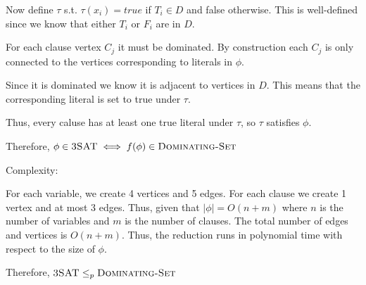 \documentclass[12pt, letterpaper]{article}
\begin{document}
\begin{problemproof}
    Now define $\tau$ s.t. $\tau(x_i)=true$ if $T_i \in D$ and false otherwise. This is well-defined since we know that either $T_i$ or $F_i$ are in $D$.

    For each clause vertex $C_j$ it must be dominated. By construction each $C_j$ is only connected to the vertices corresponding to literals in $\phi$.

    Since it is dominated we know it is adjacent to vertices in $D$. This means that the corresponding literal is set to true under $\tau$.

    Thus, every caluse has at least one true literal under $\tau$, so $\tau$ satisfies $\phi$.

    Therefore, $\phi \in \textsc{3SAT} \iff f(\phi) \in \textsc{Dominating-Set}$

    Complexity:

    For each variable, we create 4 vertices and 5 edges. For each clause we create 1 vertex and at most 3 edges. Thus, given that $|\phi|=O(n+m)$ where $n$ is the number of variables and $m$ is the number of clauses. The total number of edges and vertices is $O(n+m)$. Thus, the reduction runs in polynomial time with respect to the size of $\phi$.

    Therefore, $\textsc{3SAT} \leq_p \textsc{Dominating-Set}$
\end{problemproof}
\newcommand{\set}[1]{\{#1\}}
\newcommand{\subgraphiso}{\textsc{Subgraph-Isomorphism}}
\end{document}
